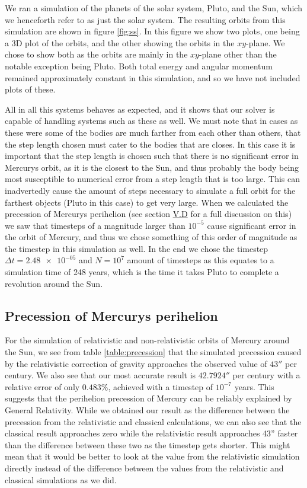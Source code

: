 \documentclass[reprint,english,notitlepage]{revtex4-1}  %
\begin{document}
We ran a simulation of the planets of the solar system, Pluto, and the Sun, which we henceforth refer to as just the solar system. The resulting orbits from this simulation are shown in figure \ref{fig:ss}. In this figure we show two plots, one being a 3D plot of the orbits, and the other showing the orbits in the $xy$-plane. We chose to show both as the orbits are mainly in the $xy$-plane other than the notable exception being Pluto. Both total energy and angular momentum remained approximately constant in this simulation, and so we have not included plots of these.

All in all this systems behaves as expected, and it shows that our solver is capable of handling systems such as these as well. We must note that in cases as these were some of the bodies are much farther from each other than others, that the step length chosen must cater to the bodies that are closes. In this case it is important that the step length is chosen such that there is no significant error in Mercurys orbit, as it is the closest to the Sun, and thus probably the body being most susceptible to numerical error from a step length that is too large. This can inadvertedly cause the amount of steps necessary to simulate a full orbit for the farthest objects (Pluto in this case) to get very large. When we calculated the precession of Mercurys perihelion (see section \hyperref[sev:V:d]{V.D} for a full discussion on this) we saw that timesteps of a magnitude larger than $10^{-5}$ cause significant error in the orbit of Mercury, and thus we chose something of this order of magnitude as the timestep in this simulation as well. In the end we chose the timestep $\Delta t = \num{2.48e-05}$ and $N = 10^7$ amount of timesteps as this equates to a simulation time of 248 years, which is the time it takes Pluto to complete a revolution around the Sun.



\subsection{Precession of Mercurys perihelion} \label{sec:V:d}
For the simulation of relativistic and non-relativistic orbits of Mercury around the Sun, we see from table \ref{table:precession} that the simulated precession caused by the relativistic correction of gravity approaches the observed value of \(43''\) per century. We also see that our most accurate result is \(42.7924''\) per century with a relative error of only \(0.483\%\), achieved with a timestep of \(10^{-7}\) years. This suggests that the perihelion precession of Mercury can be reliably explained by General Relativity. While we obtained our result as the difference between the precession from the relativistic and classical calculations, we can also see that the classical result approaches zero while the relativistic result approaches 43'' faster than the difference between these two as the timestep gets shorter. This might mean that it would be better to look at the value from the relativistic simulation directly instead of the difference between the values from the relativistic and classical simulations as we did. 
\end{document}
